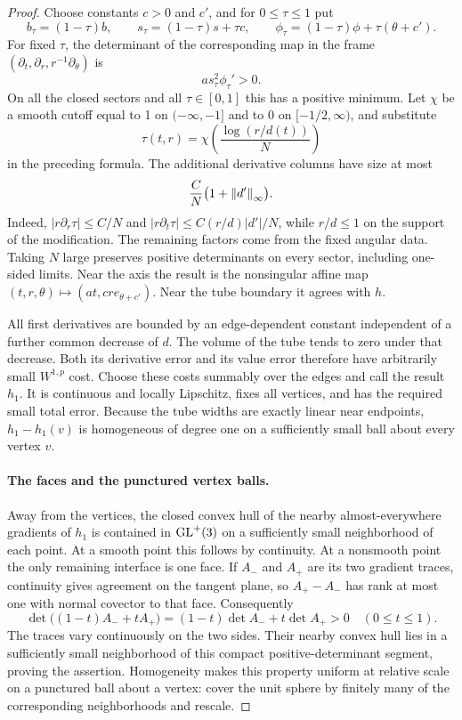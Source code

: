 \begin{proof}
Choose constants $c>0$ and $c'$, and for $0\le\tau\le1$ put
\[
 b_\tau=(1-\tau)b,\qquad
 s_\tau=(1-\tau)s+\tau c,\qquad
 \phi_\tau=(1-\tau)\phi+\tau(\theta+c').
\]
For fixed $\tau$, the determinant of the corresponding map in the
frame $(\partial_t,\partial_r,r^{-1}\partial_\theta)$ is
\begin{equation}
 \label{sm:edge-determinant}
 a s_\tau^2\phi_\tau'>0.
\end{equation}
On all the closed sectors and all $\tau\in[0,1]$ this has a
positive minimum.  Let $\chi$ be a smooth cutoff equal to 1 on
$(-\infty,-1]$ and to 0 on $[-1/2,\infty)$, and substitute
\[
 \tau(t,r)=\chi\!\left(\frac{\log(r/d(t))}{N}\right)
\]
in the preceding formula.  The additional derivative columns have
size at most
\begin{equation}
 \label{sm:edge-cutoff-error}
 \frac{C}{N}\bigl(1+\left\lVert d'\right\rVert_\infty\bigr).
\end{equation}
Indeed, $|r\partial_r\tau|\le C/N$ and
$|r\partial_t\tau|\le C(r/d)|d'|/N$, while $r/d\le1$ on
the support of the modification.  The remaining factors come from
the fixed angular data.  Taking $N$ large preserves positive
determinants on every sector, including one-sided limits.
Near the axis the result is the nonsingular affine map
$(t,r,\theta)\mapsto(at,cr e_{\theta+c'})$.
Near the tube boundary it agrees with $h$.

All first derivatives are bounded by an edge-dependent constant
independent of a further common decrease of $d$.  The volume of the
tube tends to zero under that decrease.  Both its derivative error
and its value error therefore have arbitrarily small $W^{1,p}$
cost.  Choose these costs summably over the edges and call the
result $h_1$.  It is continuous and locally Lipschitz, fixes all
vertices, and has the required small total error.  Because the
tube widths are exactly linear near endpoints, $h_1-h_1(v)$ is
homogeneous of degree one on a sufficiently small ball about every
vertex $v$.

\paragraph{The faces and the punctured vertex balls.}
Away from the vertices, the closed convex hull of the nearby
almost-everywhere gradients of $h_1$ is contained in
$\operatorname{GL}^+(3)$ on a sufficiently small neighborhood of each point.
At a smooth point this follows by continuity.  At a nonsmooth
point the only remaining interface is one face.  If $A_-$ and
$A_+$ are its two gradient traces, continuity gives agreement on
the tangent plane, so $A_+-A_-$ has rank at most one with normal
covector to that face.  Consequently
\begin{equation}
 \label{sm:face-segment}
 \det\bigl((1-t)A_-+tA_+\bigr)
 =(1-t)\det A_-+t\det A_+>0\quad(0\le t\le1).
\end{equation}
The traces vary continuously on the two sides.  Their nearby
convex hull lies in a sufficiently small neighborhood of this
compact positive-determinant segment, proving the assertion.
Homogeneity makes this property uniform at relative scale on
a punctured ball about a vertex: cover the unit sphere by finitely
many of the corresponding neighborhoods and rescale.


\end{proof}
